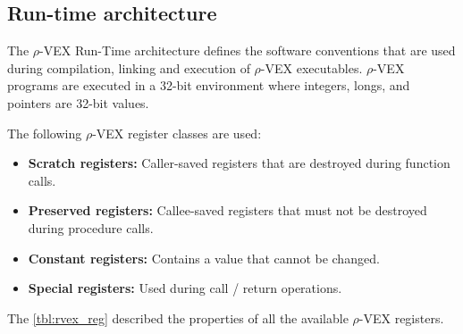 \subsection{Run-time architecture}
The $\rho$-VEX Run-Time architecture defines the software conventions that are used during compilation, linking and execution of $\rho$-VEX executables. $\rho$-VEX programs are executed in a 32-bit environment where integers, longs, and pointers are 32-bit values. 

The following $\rho$-VEX register classes are used:
\begin{itemize}
  \item \textbf{Scratch registers:} Caller-saved registers that are destroyed during function calls.
  \item \textbf{Preserved registers:} Callee-saved registers that must not be destroyed during procedure calls.
  \item \textbf{Constant registers:} Contains a value that cannot be changed.
  \item \textbf{Special registers:} Used during call / return operations.
\end{itemize}

The \ref{tbl:rvex_reg} described the properties of all the available $\rho$-VEX registers.

